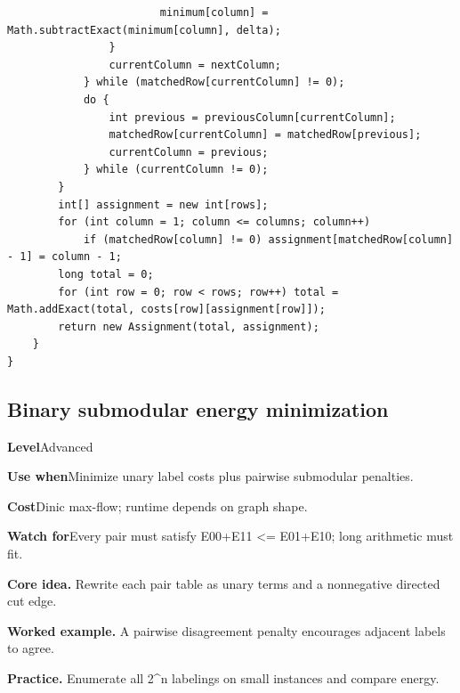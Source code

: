 \documentclass[10pt,letterpaper]{article}
\newcommand{\entrylabel}[1]{\textcolor{accent}{\bfseries #1}}
\begin{document}
\begin{lstlisting}
                        minimum[column] = Math.subtractExact(minimum[column], delta);
                }
                currentColumn = nextColumn;
            } while (matchedRow[currentColumn] != 0);
            do {
                int previous = previousColumn[currentColumn];
                matchedRow[currentColumn] = matchedRow[previous];
                currentColumn = previous;
            } while (currentColumn != 0);
        }
        int[] assignment = new int[rows];
        for (int column = 1; column <= columns; column++)
            if (matchedRow[column] != 0) assignment[matchedRow[column] - 1] = column - 1;
        long total = 0;
        for (int row = 0; row < rows; row++) total = Math.addExact(total, costs[row][assignment[row]]);
        return new Assignment(total, assignment);
    }
}
\end{lstlisting}
\subsection{Binary submodular energy minimization}
\begin{guidebox}\small
\entrylabel{Level}\quad Advanced\par
\entrylabel{Use when}\quad Minimize unary label costs plus pairwise submodular penalties.\par
\entrylabel{Cost}\quad Dinic max-flow; runtime depends on graph shape.\par
\entrylabel{Watch for}\quad Every pair must satisfy E00+E11 <= E01+E10; long arithmetic must fit.\par
\end{guidebox}
\noindent\textbf{Core idea.} Rewrite each pair table as unary terms and a nonnegative directed cut edge.\par
\noindent\textbf{Worked example.} A pairwise disagreement penalty encourages adjacent labels to agree.\par
\noindent\textbf{Practice.} Enumerate all 2\textasciicircum{}n labelings on small instances and compare energy.\par
\end{document}

